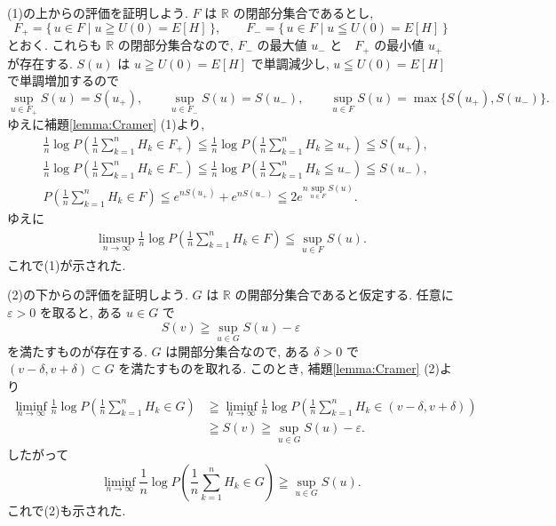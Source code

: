 \documentclass[12pt,twoside]{jarticle}
\makeatletter
\newcommand\R{{\mathbb R}} %
\newcommand\eps{\varepsilon}
\theoremstyle{definition} %
\theoremstyle{definition} %
\theoremstyle{definition} %
\numberwithin{theorem}{section}
\numberwithin{equation}{section}
\numberwithin{figure}{section}
\numberwithin{table}{section}
\newcommand\theoremref[1]{定理\ref{#1}}
\newcommand\lemmaref[1]{補題\ref{#1}}
\renewenvironment{proof}[1][\proofname]{\par
  \normalfont
  \topsep6\p@\@plus6\p@ \trivlist
  \item[\hskip\labelsep{\bfseries #1}\@addpunct{\bfseries.}]\ignorespaces
}{%
  \endtrivlist
}
\renewcommand{\proofname}{証明}
\makeatother
\begin{document}
\begin{proof}[\theoremref{theorem:Cramer}の証明]
(1)の上からの評価を証明しよう.
$F$ は $\R$ の閉部分集合であるとし,
\[
F_+=\{\,u\in F\mid u\geqq U(0)=E[H]\,\}, \qquad
F_-=\{\,u\in F\mid u\leqq U(0)=E[H]\,\}
\]
とおく. これらも $\R$ の閉部分集合なので, 
$F_-$ の最大値 $u_-$ と　$F_+$ の最小値 $u_+$ が存在する.
$S(u)$ は $u\geqq U(0)=E[H]$ で単調減少し,
$u\leqq U(0)=E[H]$ で単調増加するので
\[
\sup_{u\in F_+}S(u) = S(u_+), \qquad
\sup_{u\in F_-}S(u) = S(u_-), \qquad
\sup_{u\in F}S(u) = \max\{S(u_+),S(u_-)\}.
\]
ゆえに\lemmaref{lemma:Cramer} (1)より,
\begin{align*}
&
\frac{1}{n}\log
P\left(\frac{1}{n}\sum_{k=1}^n H_k\in F_+\right)
\leqq
\frac{1}{n}\log
P\left(\frac{1}{n}\sum_{k=1}^n H_k\geqq u_+\right)
\leqq
S(u_+),
\\ &
\frac{1}{n}\log
P\left(\frac{1}{n}\sum_{k=1}^n H_k\in F_-\right)
\leqq
\frac{1}{n}\log
P\left(\frac{1}{n}\sum_{k=1}^n H_k\leqq u_-\right)
\leqq
S(u_-),
\\ &
P\left(\frac{1}{n}\sum_{k=1}^n H_k\in F\right)
\leqq e^{n S(u_+)}+e^{n S(u_-)}
\leqq 2e^{n \sup_{u\in F}S(u)}.
\end{align*}
ゆえに
\begin{align*}
\limsup_{n\to\infty}
\frac{1}{n}\log
P\left(\frac{1}{n}\sum_{k=1}^n H_k\in F\right)
\leqq \sup_{u\in F}S(u).
\end{align*}
これで(1)が示された.

(2)の下からの評価を証明しよう.
$G$ は $\R$ の開部分集合であると仮定する. 
任意に $\eps>0$ を取ると, ある $u\in G$ で
\[
S(v)\geqq \sup_{u\in G}S(u)-\eps
\]
を満たすものが存在する. 
$G$ は開部分集合なので, ある $\delta>0$ 
で $(v-\delta,v+\delta)\subset G$ を満たすものを取れる.
このとき, \lemmaref{lemma:Cramer} (2)より
\begin{align*}
\liminf_{n\to\infty}
\frac{1}{n}\log
P\left(\frac{1}{n}\sum_{k=1}^n H_k\in G\right)
&
\geqq
\liminf_{n\to\infty}
\frac{1}{n}\log
P\left(\frac{1}{n}\sum_{k=1}^n H_k\in (v-\delta,v+\delta)\right)
\\ &
\geqq S(v)
\geqq \sup_{u\in G} S(u)-\eps.
\end{align*}
したがって
\[
\liminf_{n\to\infty}
\frac{1}{n}\log
P\left(\frac{1}{n}\sum_{k=1}^n H_k\in G\right)
\geqq
\sup_{u\in G} S(u).
\]
これで(2)も示された.


\end{proof}
\end{document}
